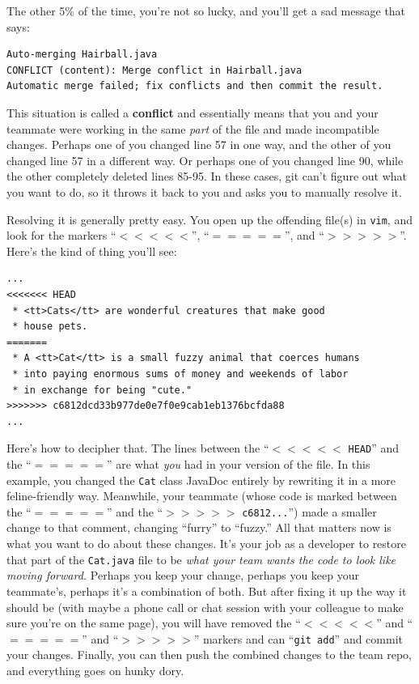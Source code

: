 \begin{itemize}
The other 5\% of the time, you're not so lucky, and you'll get a sad message
that says:

\begin{Verbatim}[fontsize=\small,samepage=true,frame=none]
Auto-merging Hairball.java
CONFLICT (content): Merge conflict in Hairball.java
Automatic merge failed; fix conflicts and then commit the result.
\end{Verbatim}

This situation is called a \textbf{conflict} and essentially means that you
and your teammate were working in the same \textit{part} of the file and made
incompatible changes. Perhaps one of you changed line 57 in one way, and the
other of you changed line 57 in a different way. Or perhaps one of you changed
line 90, while the other completely deleted lines 85-95. In these cases, git
can't figure out what you want to do, so it throws it back to you and asks you
to manually resolve it.

Resolving it is generally pretty easy. You open up the offending file(s) in
\texttt{vim}, and look for the markers ``$<<<<<$'', ``$=====$'', and
``$>>>>>$''. Here's the kind of thing you'll see:

\begin{Verbatim}[fontsize=\small,samepage=true,frame=single]
...
<<<<<<< HEAD
 * <tt>Cats</tt> are wonderful creatures that make good 
 * house pets.
=======
 * A <tt>Cat</tt> is a small fuzzy animal that coerces humans
 * into paying enormous sums of money and weekends of labor
 * in exchange for being "cute."
>>>>>>> c6812dcd33b977de0e7f0e9cab1eb1376bcfda88
...
\end{Verbatim}

Here's how to decipher that. The lines between the ``$<<<<<$ \texttt{HEAD}''
and the ``$=====$'' are what \textit{you} had in your version of the file. In
this example, you changed the \texttt{Cat} class JavaDoc entirely by rewriting
it in a more feline-friendly way. Meanwhile, your teammate (whose code is
marked between the ``$=====$'' and the ``$>>>>>$ \texttt{c6812...}'') made a
smaller change to that comment, changing ``furry'' to ``fuzzy.'' All that
matters now is what you want to do about these changes. It's your job as a
developer to restore that part of the \texttt{Cat.java} file to be
\textit{what your team wants the code to look like moving forward.} Perhaps
you keep your change, perhaps you keep your teammate's, perhaps it's a
combination of both. But after fixing it up the way it should be (with maybe a
phone call or chat session with your colleague to make sure you're on the same
page), you will have removed the ``$<<<<<$'' and ``$=====$'' and ``$>>>>>$''
markers and can ``\texttt{git add}'' and commit your changes. Finally, you can
then push the combined changes to the team repo, and everything goes on hunky
dory.


\end{itemize}
